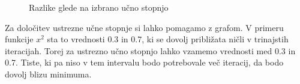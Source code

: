 \documentclass{article}
\begin{document}
\begin{figure}[h]
    \centering
    \caption{Razlike glede na izbrano učno stopnjo}
    \label{fig:foobar}
\end{figure}

\noindent Za določitev ustrezne učne stopnje si lahko pomagamo z grafom. V primeru funkcije $x^2 $ sta to vrednosti 0.3 in 0.7, ki se dovolj približata ničli v trinajstih iteracijah. Torej za ustrezno učno stopnjo lahko vzamemo vrednosti med 0.3 in 0.7. Tiste, ki pa niso v tem intervalu bodo potrebovale več iteracij, da bodo dovolj blizu minimuma.  \\
\end{document}
